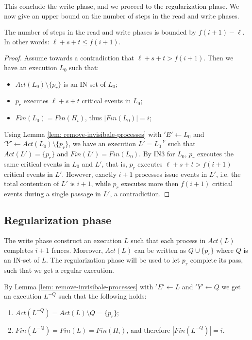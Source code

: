 This conclude the write phase, and we proceed to the regularization phase. We now give an upper bound on the number of steps in the read and write phases.

\begin{claim-section} \label{claim: write-upper-bound}
	The number of steps in the read and write phases is bounded by $f(i+1)-\ell$. In other words: $\ell+s+t \leq f(i+1)$.
\end{claim-section}

\begin{proof}
	Assume towards a contradiction that $\ell+s+t > f(i+1)$. Then we have an execution $L_0$ such that:
	\begin{itemize}
		\item $Act(L_0) \setminus \{p_r\}$ is an IN-set of $L_0$;
		\item $p_r$ executes $\ell+s+t$ critical events in $L_0$;
		\item $Fin(L_0) = Fin(H_i)$, thus $|Fin(L_0)| = i$;
	\end{itemize}

Using Lemma \ref{lem: remove-invisibale-processes} with $'E' \leftarrow L_0$ and $'Y' \leftarrow Act(L_0) \setminus \{p_r\}$, we have an execution $L' = L_0^{-Y}$ such that $Act(L') = \{p_r\}$ and $Fin(L') = Fin(L_0)$. By IN3 for $L_0$, $p_r$ executes the same critical events in $L_0$ and $L'$, that is, $p_r$ executes $\ell+s+t > f(i+1)$ critical events in $L'$. However, exactly $i+1$ processes issue events in $L'$, i.e. the total contention of $L'$ is $i+1$, while $p_r$ executes more then $f(i+1)$ critical events during a single passage in $L'$, a contradiction.
\end{proof}



\newpage
\subsection{Regularization phase}
The write phase construct an execution $L$ such that each process in $Act(L)$ completes $i+1$ fences. Moreover, $Act(L)$ can be written as $Q \cup \{p_r\}$ where $Q$ is an IN-set of $L$. The regularization phase will be used to let $p_r$ complete its pass, such that we get a regular execution.

By Lemma \ref{lem: remove-invisibale-processes} with $'E' \leftarrow L$ and $'Y' \leftarrow Q$ we get an execution $L^{-Q}$ such that the following holds:
\begin{enumerate}
	\item $Act(L^{-Q}) = Act(L) \setminus Q = \{p_r\}$;
	\item $Fin(L^{-Q}) = Fin(L) = Fin(H_i)$, and therefore $|Fin(L^{-Q})| = i$.
\end{enumerate}

